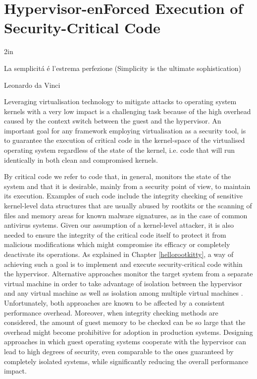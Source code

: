 \newcommand{\HRK}{\emph{Hello rootKitty}}

\chapter{Hypervisor-enForced Execution of Security-Critical Code}\label{hyperforce}

\epigraph{2in}{La semplicit\'a \'e l'estrema perfezione (Simplicity is the ultimate sophistication)}{Leonardo da Vinci}{}




Leveraging virtualisation technology to mitigate attacks to operating system kernels with a very low impact is a challenging task because of the high overhead caused by the context switch between the guest and the hypervisor. An important goal for any framework employing virtualisation as a security tool, is to guarantee the execution of critical code in the kernel-space of the virtualised operating system regardless of the state of the kernel, i.e. code that will run identically in both clean and compromised kernels.

By critical code we refer to code that, in general, monitors the state of the system and that it is desirable, mainly from a security point of view, to maintain its execution. Examples of such code include the integrity checking of sensitive kernel-level data structures that are usually abused by rootkits or the scanning of files and memory areas for known malware signatures, as in the case of common antivirus systems. 
Given our assumption of a kernel-level attacker, it is also needed to ensure the integrity of the critical code itself to protect it from malicious modifications which might compromise its efficacy or completely deactivate its operations.
As explained in Chapter \ref{hellorootkitty}, a way of achieving such a goal is to implement and execute security-critical code within the hypervisor. Alternative approaches monitor the target system from a separate virtual machine in order to take advantage of isolation between the hypervisor and any virtual machine as well as isolation among multiple virtual machines \cite{lares, outvm, livewire}.
Unfortunately, both approaches are known to be affected by a consistent performance overhead. Moreover, when integrity checking methods are considered, the amount of guest memory to be checked can be so large that the overhead might become prohibitive for adoption in production systems.
Designing approaches in which guest operating systems cooperate with the hypervisor can lead to high degrees of security, even comparable to the ones guaranteed by completely isolated systems, while significantly reducing the overall performance impact.


